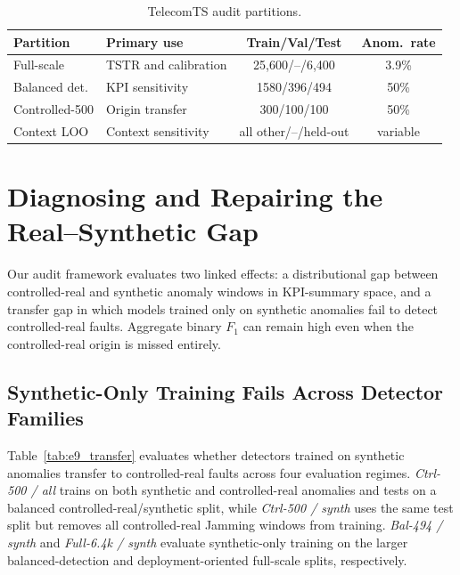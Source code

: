 \documentclass[sigconf,review]{acmart}
\begin{document}
\begin{table}[t]
  \caption{TelecomTS audit partitions.}
  \label{tab:splits}
  \small
  \setlength{\tabcolsep}{2.5pt}
  \begin{tabular}{@{}llcc@{}}
    \toprule
    \textbf{Partition} & \textbf{Primary use} & \textbf{Train/Val/Test} & \textbf{Anom.\ rate} \\
    \midrule
    Full-scale     & TSTR and calibration  & 25{,}600/--/6{,}400 & 3.9\% \\
    Balanced det.  & KPI sensitivity       & 1580/396/494 & 50\% \\
    Controlled-500 & Origin transfer       & 300/100/100 & 50\% \\
    Context LOO    & Context sensitivity   & all other/--/held-out & variable \\
    \bottomrule
  \end{tabular}
\end{table}

\section{Diagnosing and Repairing the Real--Synthetic Gap}
\label{sec:analysis}

Our audit framework evaluates two linked effects: a distributional gap between controlled-real and synthetic anomaly windows in KPI-summary space, and a transfer gap in which models trained only on synthetic anomalies fail to detect controlled-real faults. Aggregate binary $F_1$ can remain high even when the controlled-real origin is missed entirely.

\subsection{Synthetic-Only Training Fails Across Detector Families}
\label{sec:real-synth}

Table~\ref{tab:e9_transfer} evaluates whether detectors trained on synthetic anomalies transfer to controlled-real faults across four evaluation regimes. \emph{Ctrl-500 / all} trains on both synthetic and controlled-real anomalies and tests on a balanced controlled-real/synthetic split, while \emph{Ctrl-500 / synth} uses the same test split but removes all controlled-real Jamming windows from training. \emph{Bal-494 / synth} and \emph{Full-6.4k / synth} evaluate synthetic-only training on the larger balanced-detection and deployment-oriented full-scale splits, respectively.
\end{document}
